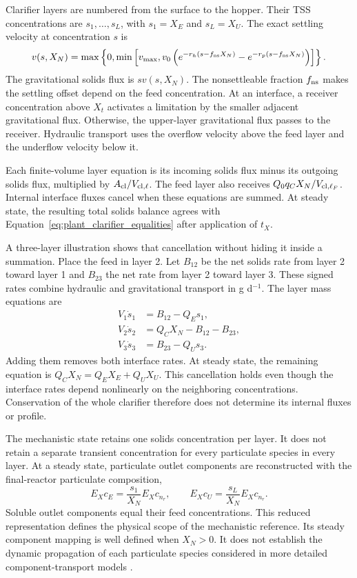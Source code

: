 Clarifier layers are numbered from the surface to the hopper. Their TSS concentrations are $s_1,\ldots,s_L$, with $s_1=X_E$ and $s_L=X_U$. The exact settling velocity at concentration $s$ is
\begin{equation}
v(s,X_N)=\max\left\{0,\min\left[v_{\max},
v_0\left(e^{-r_h(s-f_{\rm ns}X_N)}-e^{-r_p(s-f_{\rm ns}X_N)}\right)\right]\right\}.
\label{eq:plant_settling_velocity}
\end{equation}
The gravitational solids flux is $sv(s,X_N)$. The nonsettleable fraction $f_{\rm ns}$ makes the settling offset depend on the feed concentration. At an interface, a receiver concentration above $X_t$ activates a limitation by the smaller adjacent gravitational flux. Otherwise, the upper-layer gravitational flux passes to the receiver. Hydraulic transport uses the overflow velocity above the feed layer and the underflow velocity below it.

Each finite-volume layer equation is its incoming solids flux minus its outgoing solids flux, multiplied by $A_{\rm cl}/V_{{\rm cl},\ell}$. The feed layer also receives $Q_0q_CX_N/V_{{\rm cl},\ell_F}$. Internal interface fluxes cancel when these equations are summed. At steady state, the resulting total solids balance agrees with Equation~\eqref{eq:plant_clarifier_equalities} after application of $t_X$.

A three-layer illustration shows that cancellation without hiding it inside a summation. Place the feed in layer 2. Let $B_{12}$ be the net solids rate from layer 2 toward layer 1 and $B_{23}$ the net rate from layer 2 toward layer 3. These signed rates combine hydraulic and gravitational transport in g d$^{-1}$. The layer mass equations are
\begin{align}
V_1\dot s_1&=B_{12}-Q_Es_1,\\
V_2\dot s_2&=Q_CX_N-B_{12}-B_{23},\\
V_3\dot s_3&=B_{23}-Q_Us_3.
\end{align}
Adding them removes both interface rates. At steady state, the remaining equation is $Q_CX_N=Q_EX_E+Q_UX_U$. This cancellation holds even though the interface rates depend nonlinearly on the neighboring concentrations. Conservation of the whole clarifier therefore does not determine its internal fluxes or profile.

The mechanistic state retains one solids concentration per layer. It does not retain a separate transient concentration for every particulate species in every layer. At a steady state, particulate outlet components are reconstructed with the final-reactor particulate composition,
\begin{equation}
E_Xc_E=\frac{s_1}{X_N}E_Xc_{n_r},\qquad
E_Xc_U=\frac{s_L}{X_N}E_Xc_{n_r}.
\label{eq:plant_outlet_reconstruction}
\end{equation}
Soluble outlet components equal their feed concentrations. This reduced representation defines the physical scope of the mechanistic reference. Its steady component mapping is well defined when $X_N>0$. It does not establish the dynamic propagation of each particulate species considered in more detailed component-transport models \citep{JeppssonDiehl1996}.

